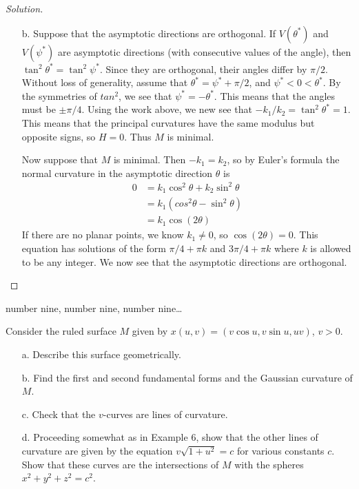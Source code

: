 \documentclass[Shifrin_Solutions_Spring_2018]{subfiles}
\begin{document}
\begin{proof}[Solution]
\begin{itemize}
\item[b.] Suppose that the asymptotic directions are orthogonal. If $V(\theta^\ast)$ and $V(\psi^\ast)$ are asymptotic directions (with consecutive values of the angle), then $\tan^2\theta^\ast = \tan^2\psi^\ast$. Since they are orthogonal, their angles differ by $\pi/2$. Without loss of generality, assume that $\theta^\ast = \psi^\ast + \pi/2$, and $\psi^\ast < 0 < \theta^\ast$. By the symmetries of $tan^2$, we see that $\psi^\ast = - \theta^\ast$. This means that the angles must be $\pm \pi/4$. Using the work above, we new see that $-k_1/k_2 = \tan^2\theta^\ast = 1$. This means that the principal curvatures have the same modulus but opposite signs, so $H=0$. Thus $M$ is minimal.

Now suppose that $M$ is minimal. Then $-k_1=k_2$, so by Euler's formula the normal curvature in the asymptotic direction $\theta$ is
\[
\begin{split}
0 & = k_1 \cos^2\theta + k_2 \sin^2\theta \\
	& = k_1 \left( cos^2\theta - \sin^2\theta \right) \\
	& = k_1 \cos(2\theta)
\end{split}
\]
If there are no planar points, we know $k_1 \neq 0$, so $\cos(2\theta) = 0$. This equation has solutions of the form $\pi/4 + \pi k$ and $3\pi/4 + \pi k$ where $k$ is allowed to be any integer. We now see that the asymptotic directions are orthogonal.
\end{itemize}
\end{proof}

\begin{exercise}
number nine, number nine, number nine\dots
\end{exercise}

\begin{exercise}
Consider the ruled surface $M$ given by $x(u,v) = \left( v\cos u, v\sin u , uv \right)$, $v>0$.
\begin{itemize}
\item[a.] Describe this surface geometrically.
\item[b.] Find the first and second fundamental forms and the Gaussian curvature of $M$.
\item[c.] Check that the $v$-curves are lines of curvature.
\item[d.] Proceeding somewhat as in Example 6, show that the other lines of curvature are given by the equation $v\sqrt{1+u^2}= c$ for various constants $c$. Show that these curves are the intersections of $M$ with the spheres $x^2+y^2+z^2 = c^2$.
\end{itemize}
\end{exercise}
\end{document}
